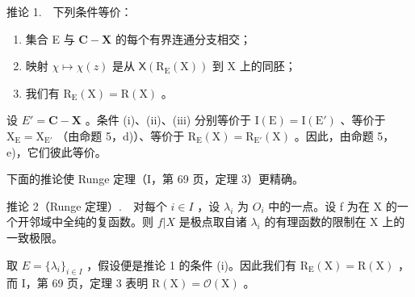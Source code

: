 推论 1.　下列条件等价：

\begin{enumerate}
\def\labelenumi{(\roman{enumi})}
\item
  集合 E 与 \(\mathbf{C} - \mathbf{X}\) 的每个有界连通分支相交；
\item
  映射 \(\chi \mapsto \chi (z)\) 是从 \(\mathsf{X}(\mathrm{R}_{\mathrm{E}}(\mathrm{X}))\) 到 \(\mathrm{X}\) 上的同胚；
\item
  我们有 \(\mathrm{R_E(X)} = \mathrm{R(X)}\) 。
\end{enumerate}

设 \(E' = \mathbf{C} - \mathbf{X}\) 。条件 (i)、(ii)、(iii) 分别等价于 \(\mathrm{I}(\mathrm{E}) = \mathrm{I}(\mathrm{E}')\) 、等价于 \(\mathrm{X}_{\mathrm{E}} = \mathrm{X}_{\mathrm{E}'}\) （由命题 5，d)）、等价于 \(\mathrm{R}_{\mathrm{E}}(\mathrm{X}) = \mathrm{R}_{\mathrm{E}'}(\mathrm{X})\) 。因此，由命题 5，e)，它们彼此等价。

下面的推论使 Runge 定理（I，第 69 页，定理 3）更精确。

推论 2（Runge 定理）.　对每个 \(i \in I\) ，设 \(\lambda_{i}\) 为 \(O_{i}\) 中的一点。设 f 为在 X 的一个开邻域中全纯的复函数。则 \(f|X\) 是极点取自诸 \(\lambda_{i}\) 的有理函数的限制在 X 上的一致极限。

取 \(E = \{\lambda_{i}\}_{i \in I}\) ，假设便是推论 1 的条件 (i)。因此我们有 \(\mathrm{R}_{\mathrm{E}}(\mathrm{X}) = \mathrm{R}(\mathrm{X})\) ，而 I，第 69 页，定理 3 表明 \(\mathrm{R}(\mathrm{X}) = \mathcal{O}(\mathrm{X})\) 。

